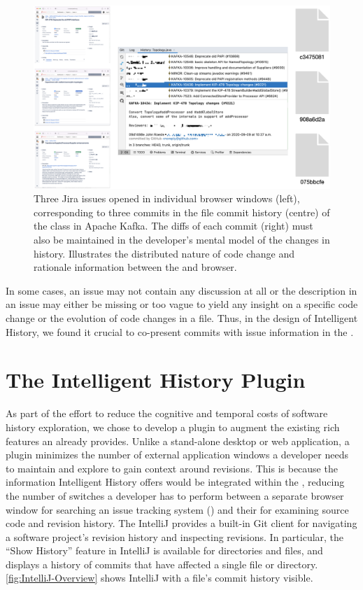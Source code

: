 \begin{figure}
    \center
    \includegraphics[width=\textwidth]{./images/cognitive-load.png}
    \caption{
        Three Jira issues opened in individual browser windows (left), corresponding to three commits in the file commit history (centre) of the  class in Apache Kafka. The diffs of each commit (right) must also be maintained in the developer's mental model of the changes in history. Illustrates the distributed nature of code change and rationale information between the  and browser.
    }
    \label{fig:Cognitive-Load}
\end{figure}

In some cases, an issue may not contain any discussion at all or the description in an issue may either be missing or too vague to yield any insight on a specific code change or the evolution of code changes in a file.
Thus, in the design of Intelligent History, we found it crucial to co-present commits with issue information in the .

\section{The Intelligent History Plugin}
\label{sec:Implementation}

As part of the effort to reduce the cognitive and temporal costs of software history exploration, we chose to develop a plugin to augment the existing rich features an  already provides.
Unlike a stand-alone desktop or web application, a plugin minimizes the number of external application windows a developer needs to maintain and explore to gain context around revisions. 
This is because the information Intelligent History offers would be integrated within the , reducing the number of switches a developer has to perform between a separate browser window for searching an issue tracking system () and their  for examining source code and revision history.
The IntelliJ  provides a built-in Git client  for navigating a software project's revision history and inspecting revisions. 
In particular, the ``Show History'' feature in IntelliJ is available for directories and files, and displays a history of commits that have affected a single file or directory.
\autoref{fig:IntelliJ-Overview} shows IntelliJ with a file's commit history visible.

